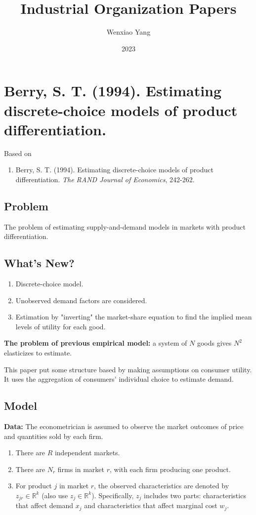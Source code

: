 \documentclass[11pt]{elegantbook}
\title{\textbf{Industrial Organization Papers}}
\author{Wenxiao Yang}
\institute{Haas School of Business, University of California Berkeley}
\date{2023}
\begin{document}
\maketitle
\frontmatter
\tableofcontents
\mainmatter


\chapter{Berry, S. T. (1994). Estimating discrete-choice models of product differentiation.}
Based on
\begin{enumerate}[$\circ$]
    \item Berry, S. T. (1994). Estimating discrete-choice models of product differentiation. \textit{The RAND Journal of Economics}, 242-262.
\end{enumerate}


\section{Problem}
The problem of estimating supply-and-demand models in markets with product differentiation.


\section{What's New?}
\begin{enumerate}
    \item Discrete-choice model.
    \item Unobserved demand factors are considered.
    \item Estimation by "inverting" the market-share equation to find the implied mean levels of utility for each good.
\end{enumerate}
\begin{note}
    \textbf{The problem of previous empirical model:} a system of $N$ goods gives $N^2$ elasticizes to estimate.
\end{note}
This paper put some structure based by making assumptions on consumer utility. It uses the aggregation of consumers' individual choice to estimate demand.

\section{Model}
\textbf{Data:} The econometrician is assumed to observe the market outcomes of price and quantities sold by each firm.

\begin{enumerate}
    \item There are $R$ independent markets.
    \item There are $N_r$ firms in market $r$, with each firm producing one product.
    \item For product $j$ in market $r$, the observed characteristics are denoted by $z_{jr}\in \mathbb{R}^k$ (also use $z_j\in \mathbb{R}^k$). Specifically, $z_j$ includes two parts: characteristics that affect demand $x_j$ and characteristics that affect marginal cost $w_j$.
\end{enumerate}
\end{document}
